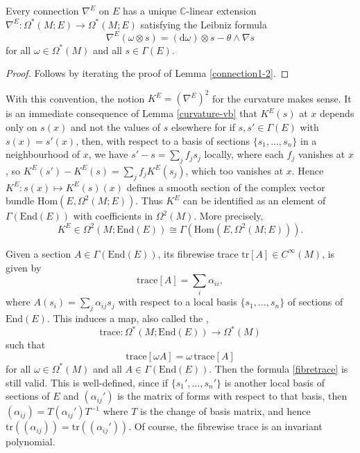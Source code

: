 \documentclass[a4paper,openany]{scrbook}
\newcommand{\ud}{\mathrm{d}}
\begin{document}
\begin{lemma}
Every connection $\nabla^E$ on $E$ has a unique $\mathbb{C}$-linear extension $\nabla^E:\Omega^*(M;E)\to\Omega^*(M;E)$ satisfying the Leibniz formula
\begin{equation}
\nabla^E(\omega\otimes s)=(\ud\omega)\otimes s-\theta\wedge\nabla s
\end{equation}
for all $\omega\in\Omega^*(M)$ and all $s\in\Gamma(E)$.
\end{lemma}
\begin{proof}
Follows by iterating the proof of Lemma \ref{connection1-2}.
\end{proof}

With this convention, the notion $K^E=(\nabla^E)^2$ for the curvature makes sense. It is an immediate consequence of Lemma \ref{curvature-vb} that $K^E(s)$ at $x$ depends only on $s(x)$ and not the values of $s$ elsewhere for if $s,s'\in\Gamma(E)$ with $s(x)=s'(x)$, then, with respect to a basis of sections $\{s_1,\dots,s_n\}$ in a neighbourhood of $x$, we have $s'-s=\sum_jf_js_j$ locally, where each $f_j$ vanishes at $x$, so $K^E(s')-K^E(s)=\sum_jf_jK^E(s_j)$, which too vanishes at $x$. Hence $K^E:s(x)\mapsto K^E(s)(x)$ defines a smooth section of the complex vector bundle $\text{Hom}(E,\Omega^2(M;E))$. Thus $K^E$ can  be identified as an element of $\Gamma(\text{End}(E))$ with coefficients in $\Omega^2(M)$. More precisely,
\begin{equation*}
K^E\in\Omega^2(M;\text{End}(E))\cong\Gamma(\text{Hom}(E,\Omega^2(M;E))).
\end{equation*}


Given a section $A\in\Gamma(\text{End}(E))$, its fibrewise trace $\text{tr}[A]\in C^\infty(M)$, is given by 
\begin{equation}\label{fibretrace}
\text{trace}[A]=\sum_i\alpha_{ii},
\end{equation}
where $A(s_i)=\sum_{j}\alpha_{ij}s_j$ with respect to a local basis $\{s_1,\dots,s_n\}$ of sections of $\text{End}(E)$. This induces a map, also called the ,
\begin{equation}
\text{trace}:\Omega^*(M;\text{End}(E))\to\Omega^*(M)
\end{equation}
such that
\begin{equation*}
\text{trace}[\omega A]=\omega\,\text{trace}[A]
\end{equation*}
for all $\omega\in\Omega^*(M)$ and all $A\in\Gamma(\text{End}(E))$. Then the formula \eqref{fibretrace} is still valid. This is well-defined, since if $\{s_1',\dots,s_n'\}$ is another local basis of sections of $E$ and $(\alpha_{ij}')$ is the matrix of forms with respect to that basis, then $(\alpha_{ij})=T(\alpha_{ij}')T^{-1}$ where $T$ is the change of basis matrix, and hence $\text{tr}((\alpha_{ij}))=\text{tr}((\alpha_{ij}'))$. Of course, the fibrewise trace is an invariant polynomial.
\end{document}
